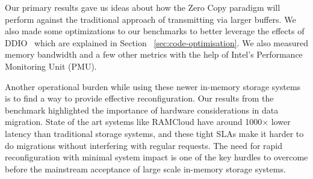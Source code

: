 Our primary results gave us ideas about how the Zero Copy paradigm will perform against
the traditional approach of transmitting via larger buffers. We also made some optimizations to our 
benchmarks to better leverage the effects of DDIO~\cite{ddio} which are explained in Section ~\ref{sec:code-optimisation}. 
We also measured memory bandwidth and a few other metrics with the help of Intel\textregistered's Performance Monitoring Unit (PMU).

Another operational burden while using these newer in-memory storage systems is to find a way to 
provide effective reconfiguration. Our results from the benchmark highlighted the importance of 
hardware considerations in data migration. State of the art systems like RAMCloud have around 1000$\times$
lower latency than traditional storage systems, and these tight SLAs make it harder to do migrations
without interfering with regular requests. The need for rapid reconfiguration with minimal system 
impact is one of the key hurdles to overcome before the mainstream acceptance of large scale 
in-memory storage systems.

